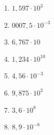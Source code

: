 %
%
  \begin{enumerate}[cols=4]
    \item $1,597\cdot 10^3$
    \item $0007,5\cdot 10^{-3}$
    \item $6,767\cdot 10 $
    \item $1,234\cdot 10^{10}$
    \item $4,56\cdot 10^{-3}$
    \item $9,875\cdot 10^3$
    \item $3,6\cdot 10^8$
    \item $8,9\cdot 10^{-8}$
  \end{enumerate}
